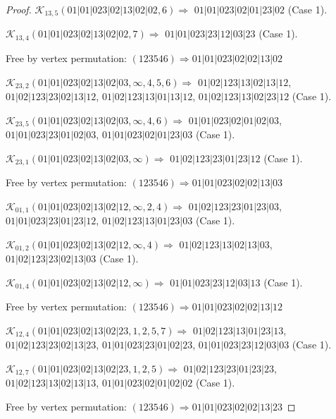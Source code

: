 \documentclass[12pt]{article}
\theoremstyle{plain}
\theoremstyle{definition}
\theoremstyle{remark}
\newcommand{\fancy}[1]{\mathcal{#1}}
\def\K{\fancy{K}}
\begin{document}
\begin{proof}
	$\K_{13,5}(01|01|023|02|13|02|02,6)\Rightarrow $ $01|01|023|02|01|23|02$ (Case 1).
	
	$\K_{13,4}(01|01|023|02|13|02|02,7)\Rightarrow $ $01|01|023|23|12|03|23$ (Case 1).
	
	
	
	Free by vertex permutation: $(1 2 3 5 4 6)\Rightarrow 01|01|023|02|02|13|02$
	
	
	
	\bigskip
	
	$\K_{23,2}(01|01|023|02|13|02|03,\infty,4, 5, 6)\Rightarrow $ $01|02|123|13|02|13|12$, $01|02|123|23|02|13|12$, $01|02|123|13|01|13|12$, $01|02|123|13|02|23|12$ (Case 1).
	
	$\K_{23,5}(01|01|023|02|13|02|03,\infty,4, 6)\Rightarrow $ $01|01|023|02|01|02|03$, $01|01|023|23|01|02|03$, $01|01|023|02|01|23|03$ (Case 1).
	
	$\K_{23,1}(01|01|023|02|13|02|03,\infty)\Rightarrow $ $01|02|123|23|01|23|12$ (Case 1).
	
	
	
	Free by vertex permutation: $(1 2 3 5 4 6)\Rightarrow 01|01|023|02|02|13|03$
	
	
	
	\bigskip
	
	$\K_{01,1}(01|01|023|02|13|02|12,\infty,2, 4)\Rightarrow $ $01|02|123|23|01|23|03$, $01|01|023|23|01|23|12$, $01|02|123|13|01|23|03$ (Case 1).
	
	$\K_{01,2}(01|01|023|02|13|02|12,\infty,4)\Rightarrow $ $01|02|123|13|02|13|03$, $01|02|123|23|02|13|03$ (Case 1).
	
	$\K_{01,4}(01|01|023|02|13|02|12,\infty)\Rightarrow $ $01|01|023|23|12|03|13$ (Case 1).
	
	
	
	Free by vertex permutation: $(1 2 3 5 4 6)\Rightarrow 01|01|023|02|02|13|12$
	
	
	
	\bigskip
	
	$\K_{12,4}(01|01|023|02|13|02|23,1, 2, 5, 7)\Rightarrow $ $01|02|123|13|01|23|13$, $01|02|123|23|02|13|23$, $01|01|023|23|01|02|23$, $01|01|023|23|12|03|03$ (Case 1).
	
	$\K_{12,7}(01|01|023|02|13|02|23,1, 2, 5)\Rightarrow $ $01|02|123|23|01|23|23$, $01|02|123|13|02|13|13$, $01|01|023|02|01|02|02$ (Case 1).
	
	
	
	Free by vertex permutation: $(1 2 3 5 4 6)\Rightarrow 01|01|023|02|02|13|23$
	
	
	

\end{proof}
\end{document}
